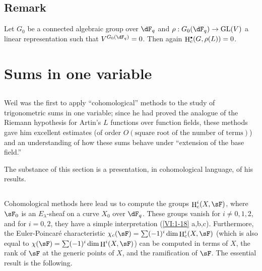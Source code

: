 \documentclass[oneside]{book}
\DeclareMathOperator{\h}{H}
\newcounter{char}
\theoremstyle{sga-source}
\theoremstyle{sga-source-dash}
\theoremstyle{sga-source-dotdash}
\theoremstyle{sga-source-number-note-dash}
\theoremstyle{sga-source-note-number-dotdash}
\theoremstyle{sga-source-example-dotdash}
\theoremstyle{sga-source-inline-number}
\theoremstyle{sga-source-bare-number}
\theoremstyle{sga-source}
\let\oldbullet\bullet
\renewcommand{\bullet}{\textnormal{\tiny$\oldbullet$}}
\newcommand{\PrintPage}[1]{}\newcommand{\MathPage}[1]{}\newcommand{\PrintCite}[2]{#1}\newcommand{\var}[3]{#1}
\begin{document}
\subsection{Remark}\label{VI:2-9}

Let $G_0$ be a connected algebraic group over $\dF_q$ and 
$\rho:G_0(\dF_q) \to \operatorname{GL}(V)$ a linear representation 
such that $V^{G_0(\dF_q)}=0$. Then again $\h_c^\bullet(G,\rho(L))=0$. 










\PrintPage{189}
\section{Sums in one variable}\label{VI:3}





\subsection{}\label{VI:3-1}

Weil was the first to apply ``cohomological'' methods to 
the study of trigonometric sums in one variable; since he had 
proved the analogue of the Riemann hypothesis for Artin's $L$ functions 
over function fields, these methods gave him excellent 
estimates (of order $O(\text{square root of the number of terms})$) and an 
understanding of how these sums behave under ``extension of the base field.'' 

The substance of this section is a presentation, in cohomological language, of 
his results. 





\subsection{}\label{VI:3-2}

Cohomological methods here lead us to compute the groups 
$\h_c^i(X,\sF)$, where $\sF_0$ is an $E_\lambda$-sheaf on a curve $X_0$ over 
$\dF_q$. These groups vanish for $i\ne 0,1,2$, and for 
$i=0,2$, they have a simple interpretation (\ref{VI:1-18} a,b,c). Furthermore, the 
Euler-Poincaré characteristic 
$\chi_c(\sF) = \sum (-1)^i \dim \h_c^i(X,\sF)$ (which is also equal to 
$\chi(\sF) = \sum (-1)^i \dim \h^i(X,\sF)$) can be computed in terms of 
$X$, the rank of $\sF$ at the generic points of $X$, and the 
ramification of $\sF$. The essential result is the following. 
\end{document}

